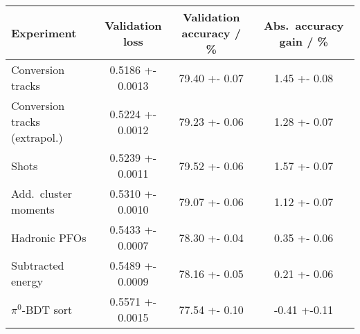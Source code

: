 \begin{tabular}{lS[table-format=1.4(4)]S[table-format=2.2(2)]S[table-format=1.2(2)]}
  \toprule
  {Experiment} & {Validation loss} & {Validation accuracy / \si{\percent}} & {Abs.\ accuracy gain / \si{\percent}} \\
  \midrule
  Conversion tracks & 0.5186 +- 0.0013 & 79.40 +- 0.07 & 1.45 +- 0.08 \\
  Conversion tracks (extrapol.) & 0.5224 +- 0.0012 & 79.23 +- 0.06 & 1.28 +- 0.07 \\
  Shots & 0.5239 +- 0.0011 & 79.52 +- 0.06 &  1.57 +- 0.07 \\
  Add.\ cluster moments & 0.5310 +- 0.0010 & 79.07 +- 0.06 & 1.12 +- 0.07 \\
  Hadronic PFOs & 0.5433 +- 0.0007 & 78.30 +- 0.04 & 0.35 +- 0.06 \\
  Subtracted energy & 0.5489 +- 0.0009 & 78.16 +- 0.05 & 0.21 +- 0.06 \\
  $\pi^0$-BDT sort & 0.5571 +- 0.0015 & 77.54 +- 0.10 & -0.41 +-0.11 \\
  \bottomrule
\end{tabular}

